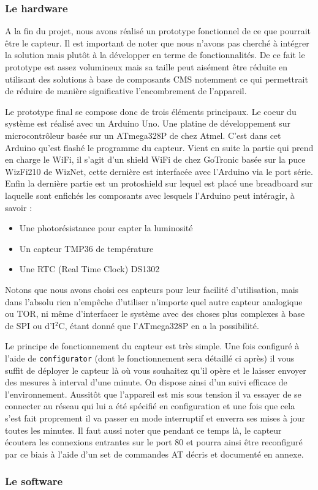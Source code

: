 		\subsubsection{Le hardware}
		\par
		A la fin du projet, nous avons réalisé un prototype fonctionnel de ce
		que pourrait être le capteur. Il est important de noter que nous n'avons
		pas cherché à intégrer la solution mais plutôt à la développer en terme
		de fonctionnalités. De ce fait le prototype est assez volumineux mais
		sa taille peut aisément être réduite en utilisant des solutions à base
		de composants CMS notemment ce qui permettrait de réduire de manière
		significative l'encombrement de l'appareil.
		\par
		Le prototype final se compose donc de trois éléments principaux. Le coeur
		du système est réalisé avec un Arduino Uno. Une platine de développement
		sur microcontrôleur basée sur un ATmega328P de chez Atmel. C'est dans cet
		Arduino qu'est flashé le programme du capteur. Vient en suite la partie
		qui prend en charge le WiFi, il s'agit d'un shield WiFi de chez GoTronic
		basée sur la puce WizFi210 de WizNet, cette dernière est interfacée avec
		l'Arduino via le port série. Enfin la dernière partie est un protoshield
		sur lequel est placé une breadboard sur laquelle sont enfichés les composants
		avec lesquels l'Arduino peut intéragir, à savoir :
		\begin{itemize}
			\item Une photorésistance pour capter la luminosité
			\item Un capteur TMP36 de température
			\item Une RTC (Real Time Clock) DS1302
		\end{itemize}
		Notons que nous avons choisi ces capteurs pour leur facilité d'utilisation,
		mais dans l'absolu rien n'empêche d'utiliser n'importe quel autre capteur
		analogique ou TOR, ni même d'interfacer le système avec des choses plus
		complexes à base de SPI ou d'I$^2$C, étant donné que l'ATmega328P en a
		la possibilité.
		\par
		Le principe de fonctionnement du capteur est très simple. Une fois configuré
		à l'aide de \texttt{configurator} (dont le fonctionnement sera détaillé ci après)
		il vous suffit de déployer le capteur là où vous souhaitez qu'il opère et le
		laisser envoyer des mesures à interval d'une minute. On dispose ainsi
		d'un suivi efficace de l'environnement. Aussitôt que l'appareil est
		mis sous tension il va essayer de se connecter au réseau qui lui a été
		spécifié en configuration et une fois que cela s'est fait proprement il
		va passer en mode interruptif et enverra ses mises à jour toutes les minutes.
		Il faut aussi noter que pendant ce temps là, le capteur écoutera les connexions
		entrantes sur le port 80 et pourra ainsi être reconfiguré par ce biais à l'aide
		d'un set de commandes AT décris et documenté en annexe.
		
		\subsubsection{Le software}
